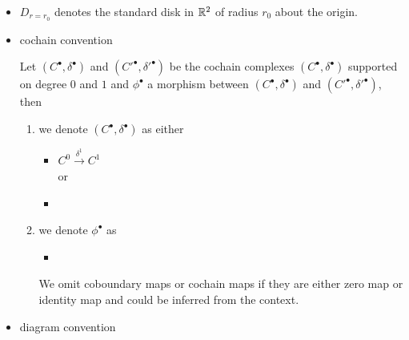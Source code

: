 \begin{itemize}
\item $D_{r=r_0}$ denotes the standard disk in $\mathbb{R}^2$ of radius $r_0$ about the origin.

\item cochain convention
\begin{definition} 
Let $(C^\bullet,\delta^\bullet)$ and $(C'^\bullet,\delta'^\bullet)$ be the cochain complexes $(C^\bullet,\delta^\bullet)$ supported on degree $0$ and $1$ and $\phi^\bullet$ a morphism between $(C^\bullet,\delta^\bullet)$ and $(C'^\bullet,\delta'^\bullet)$, then
\begin{enumerate}
\item we denote $(C^\bullet,\delta^\bullet)$ as either 
\begin{itemize}
\item $C^0 \xrightarrow{\delta^1} C^1$ \\
or  
\item {}
\end{itemize}

\item we denote $\phi^\bullet$ as 
\begin{itemize}
\item {}
\end{itemize}
We omit coboundary maps or cochain maps if they are either zero map or identity map and could be inferred from the context.
\end{enumerate}
\end{definition}

\item diagram convention
\end{itemize}
